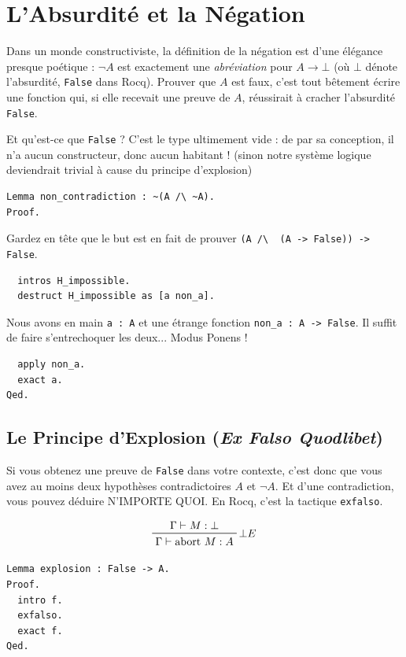 \documentclass[11pt,a4paper]{article}
\begin{document}
\section{L'Absurdité et la Négation}

Dans un monde constructiviste, la définition de la négation est d'une élégance presque poétique : $\neg A$ est exactement une \textit{abréviation} pour $A \to \bot$ (où $\bot$ dénote l'absurdité, \texttt{False} dans Rocq). Prouver que $A$ est faux, c'est tout bêtement écrire une fonction qui, si elle recevait une preuve de $A$, réussirait à cracher l'absurdité \texttt{False}.

Et qu'est-ce que \texttt{False} ? C'est le type ultimement vide : de par sa conception, il n'a aucun constructeur, donc aucun habitant ! (sinon notre système logique deviendrait trivial à cause du principe d'explosion)

\begin{lstlisting}
Lemma non_contradiction : ~(A /\ ~A).
Proof.
\end{lstlisting}

Gardez en tête que le but est en fait de prouver \texttt{(A /\textbackslash\, (A -> False)) -> False}.

\begin{lstlisting}
  intros H_impossible.
  destruct H_impossible as [a non_a].
\end{lstlisting}

Nous avons en main \texttt{a : A} et une étrange fonction \texttt{non\_a : A -> False}. Il suffit de faire s'entrechoquer les deux... Modus Ponens !

\begin{lstlisting}
  apply non_a.
  exact a.
Qed.
\end{lstlisting}

\subsection*{Le Principe d'Explosion (\textit{Ex Falso Quodlibet})}

Si vous obtenez une preuve de \texttt{False} dans votre contexte, c'est donc que vous avez au moins deux hypothèses contradictoires $A$ et $\neg A$. Et d'une contradiction, vous pouvez déduire N'IMPORTE QUOI. En Rocq, c'est la tactique \texttt{exfalso}.

$$\prftree[r]{$\bot E$}{\Gamma \vdash M : \bot}{\Gamma \vdash \text{abort } M : A}$$

\begin{lstlisting}
Lemma explosion : False -> A.
Proof.
  intro f.
  exfalso.
  exact f.
Qed.
\end{lstlisting}
\end{document}
